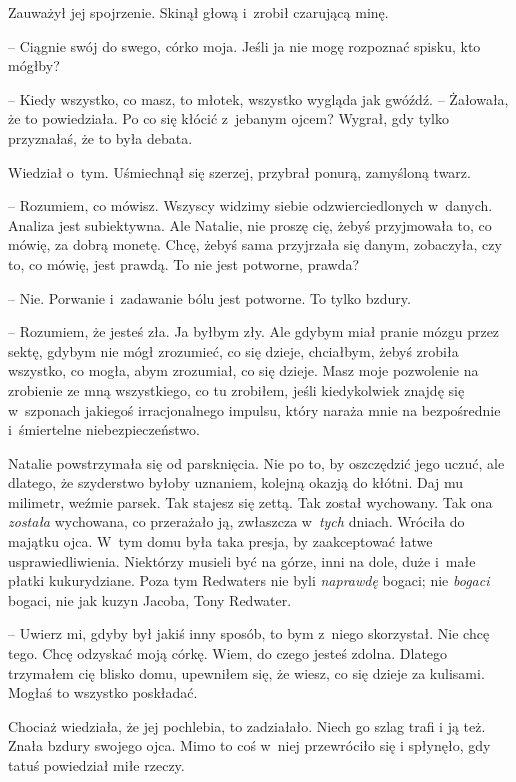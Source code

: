 \documentclass[oneside,polish,11pt,sfheadings]{mwbk}
\begin{document}
Zauważył jej spojrzenie. Skinął głową i~zrobił czarującą minę. 

-- Ciągnie
swój do swego, córko moja. Jeśli ja nie mogę rozpoznać spisku, kto
mógłby?

-- Kiedy wszystko, co masz, to młotek, wszystko wygląda jak gwóźdź. -- Żałowała, że to powiedziała. Po co się kłócić z~jebanym ojcem? Wygrał,
gdy tylko przyznałaś, że to była debata.

Wiedział o~tym. Uśmiechnął się szerzej, przybrał ponurą, zamyśloną
twarz. 

-- Rozumiem, co mówisz. Wszyscy widzimy siebie odzwierciedlonych w~danych. Analiza jest subiektywna. Ale Natalie, nie proszę cię, żebyś
przyjmowała to, co mówię, za dobrą monetę. Chcę, żebyś sama przyjrzała
się danym, zobaczyła, czy to, co mówię, jest prawdą. To nie jest
potworne, prawda?

-- Nie. Porwanie i~zadawanie bólu jest potworne. To tylko bzdury.

-- Rozumiem, że jesteś zła. Ja byłbym zły. Ale gdybym miał pranie mózgu
przez sektę, gdybym nie mógł zrozumieć, co się dzieje, chciałbym, żebyś
zrobiła wszystko, co mogła, abym zrozumiał, co się dzieje. Masz moje
pozwolenie na zrobienie ze mną wszystkiego, co tu zrobiłem, jeśli
kiedykolwiek znajdę się w~szponach jakiegoś irracjonalnego impulsu,
który naraża mnie na bezpośrednie i~śmiertelne niebezpieczeństwo.

Natalie powstrzymała się od parsknięcia. Nie po to, by oszczędzić jego
uczuć, ale dlatego, że szyderstwo byłoby uznaniem, kolejną okazją do
kłótni. Daj mu milimetr, weźmie parsek. Tak stajesz się zettą. Tak
został wychowany. Tak ona \textit{została} wychowana, co przerażało ją,
zwłaszcza w~\textit{tych} dniach. Wróciła do majątku ojca. W~tym domu była
taka presja, by zaakceptować łatwe usprawiedliwienia. Niektórzy musieli
być na górze, inni na dole, duże i~małe płatki kukurydziane. Poza tym
Redwaters nie byli \textit{naprawdę} bogaci; nie \textit{bogaci} bogaci, nie
jak kuzyn Jacoba, Tony Redwater.

-- Uwierz mi, gdyby był jakiś inny sposób, to bym z~niego skorzystał. Nie
chcę tego. Chcę odzyskać moją córkę. Wiem, do czego jesteś zdolna.
Dlatego trzymałem cię blisko domu, upewniłem się, że wiesz, co się
dzieje za kulisami. Mogłaś to wszystko poskładać.

Chociaż wiedziała, że jej pochlebia, to zadziałało. Niech go szlag trafi
i ją też. Znała bzdury swojego ojca. Mimo to coś w~niej przewróciło się
i spłynęło, gdy tatuś powiedział miłe rzeczy.
\end{document}
